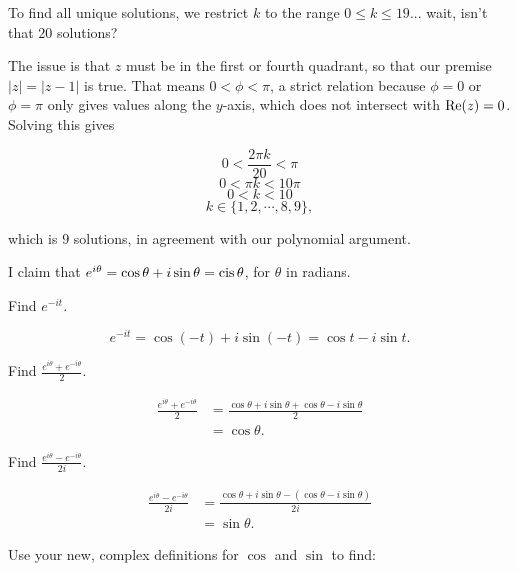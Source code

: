 \documentclass[../key.tex]{subfiles}
\begin{document}
To find all unique solutions, we restrict $k$ to the range $0\leq k\leq 19$... wait, isn't that $20$ solutions?

The issue is that $z$ must be in the first or fourth quadrant, so that our premise $|z|=|z-1|$ is true. That means $0 < \phi < \pi$, a strict relation because $\phi = 0$ or $\phi=\pi$ only gives values along the $y$-axis, which does not intersect with $\operatorname{Re}(z) = 0$. Solving this gives

$$0 < \frac{2\pi k}{20} < \pi$$
$$0 < \pi k < 10\pi$$
$$0 < k < 10$$
$$k\in \{1,2,\cdots, 8,9\},$$

which is $9$ solutions, in agreement with our polynomial argument.

\begin{outer_problem}
\item I claim that $e^{i\theta}=\cos\theta + i\sin\theta = \operatorname{cis}\theta$, for $\theta$ in radians.
\setcounter{store_outer_problem}{\value{outer_problemi}}
\end{outer_problem}

\begin{inner_problem}[start=1]
\item Find $e^{-it}$.
\end{inner_problem}

$$e^{-it} = \cos (-t) + i\sin(-t) = \cos t - i\sin t.$$

\begin{inner_problem}
\item Find $\frac{e^{i\theta} + e^{-i\theta}}{2}$.
\end{inner_problem}

\begin{align*}
\frac{e^{i\theta} + e^{-i\theta}}{2} &= \frac{\cos \theta + i\sin\theta + \cos\theta - i\sin\theta}{2} \\
&= \cos\theta.
\end{align*}

\begin{inner_problem}
\item Find $\frac{e^{i\theta} - e^{-i\theta}}{2i}$.
\end{inner_problem}

\begin{align*}
\frac{e^{i\theta} - e^{-i\theta}}{2i} &= \frac{\cos \theta + i\sin\theta - (\cos\theta - i\sin\theta)}{2i} \\
&= \sin\theta.
\end{align*}

\begin{outer_problem}
\item Use your new, complex definitions for $\cos$ and $\sin$ to find:%
\end{outer_problem}
\end{document}
